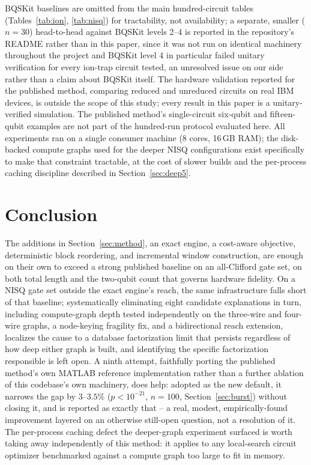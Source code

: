 \documentclass[11pt]{article}
\begin{document}
BQSKit baselines are omitted from the main hundred-circuit tables
(Tables~\ref{tab:ion}, \ref{tab:nisq}) for tractability, not availability;
a separate, smaller ($n=30$) head-to-head against BQSKit levels 2--4 is
reported in the repository's README rather than in this paper, since it
was not run on identical machinery throughout the project and BQSKit
level 4 in particular failed unitary verification for every ion-trap
circuit tested, an unresolved issue on our side rather than a claim about
BQSKit itself. The
hardware validation reported for the published method, comparing reduced
and unreduced circuits on real IBM devices, is outside the scope of this
study; every result in this paper is a unitary-verified simulation. The published
method's single-circuit six-qubit and fifteen-qubit examples are not part
of the hundred-run protocol evaluated here. All experiments ran on a
single consumer machine (8 cores, 16\,GB RAM); the disk-backed compute
graphs used for the deeper NISQ configurations exist specifically to make
that constraint tractable, at the cost of slower builds and the
per-process caching discipline described in Section~\ref{sec:deep5}.

\section{Conclusion}

The additions in Section~\ref{sec:method}, an exact engine, a cost-aware
objective, deterministic block reordering, and incremental window
construction, are enough on their own to exceed a strong published
baseline on an all-Clifford gate set, on both total length and the
two-qubit count that governs hardware fidelity. On a
NISQ gate set outside the exact engine's reach, the same infrastructure
falls short of that baseline; systematically eliminating eight candidate
explanations in turn, including compute-graph depth tested independently
on the three-wire and four-wire graphs, a node-keying fragility fix, and
a bidirectional reach extension, localizes the cause to a database
factorization limit that persists regardless of how deep either graph is
built, and identifying the specific factorization responsible is left
open. A ninth attempt, faithfully porting the published method's own
MATLAB reference implementation rather than a further ablation of this
codebase's own machinery, does help: adopted as the new default, it
narrows the gap by $3$--$3.5\%$ ($p<10^{-21}$, $n=100$,
Section~\ref{sec:burst}) without closing it, and is reported as exactly
that -- a real, modest, empirically-found improvement layered on an
otherwise still-open question, not a resolution of it. The per-process
caching defect the deeper-graph experiment surfaced is worth taking away
independently of this method: it applies to any local-search circuit
optimizer benchmarked against a compute graph too large to fit in memory.
\end{document}
